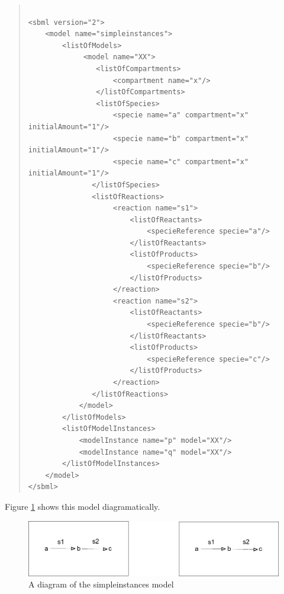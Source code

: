 \documentclass[10pt]{article}
\newcommand{\tightspacing}{\renewcommand{\baselinestretch}{0.85}}
\newcommand{\regularspacing}{\renewcommand{\baselinestretch}{1.0}}
\begin{document}
\begin{quote}

  \begin{small}

    \tightspacing

\begin{verbatim}

<sbml version="2">
    <model name="simpleinstances">
        <listOfModels>
             <model name="XX">
                <listOfCompartments>
                    <compartment name="x"/>
                </listOfCompartments>
                <listOfSpecies>
                    <specie name="a" compartment="x" initialAmount="1"/>
                    <specie name="b" compartment="x" initialAmount="1"/>
                    <specie name="c" compartment="x" initialAmount="1"/>
               </listOfSpecies>
               <listOfReactions>
                    <reaction name="s1">
                        <listOfReactants>
                            <specieReference specie="a"/>
                        </listOfReactants>
                        <listOfProducts>
                            <specieReference specie="b"/>
                        </listOfProducts>
                    </reaction>
                    <reaction name="s2">
                        <listOfReactants>
                            <specieReference specie="b"/>
                        </listOfReactants>
                        <listOfProducts>
                            <specieReference specie="c"/>
                        </listOfProducts>
                    </reaction>
               </listOfReactions>
            </model>
        </listOfModels>
        <listOfModelInstances>
            <modelInstance name="p" model="XX"/>
            <modelInstance name="q" model="XX"/>
        </listOfModelInstances>
    </model>
</sbml>

\end{verbatim}

    \regularspacing

  \end{small}

\end{quote}

Figure \ref{fig:simpleinstances} shows this model diagramatically.

\begin{figure}

  \centering

  \includegraphics[scale = 0.75]{simpleinstances}

  \caption{A diagram of the simpleinstances model}

  \label{fig:simpleinstances}

\end{figure}
\end{document}

